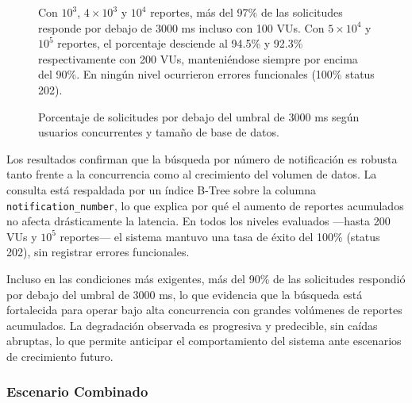 \begin{figure}[H]
\begin{minipage}{0.55\textwidth}
    \end{minipage}
    \hfill
    \begin{minipage}{0.40\textwidth}
        \small
        Con $10^3$, $4 \times 10^3$ y $10^4$ reportes, más del 97\% de las solicitudes responde por debajo de 3000 ms incluso con 100 VUs. Con $5 \times 10^4$ y $10^5$ reportes, el porcentaje desciende al 94.5\% y 92.3\% respectivamente con 200 VUs, manteniéndose siempre por encima del 90\%. 
        En ningún nivel ocurrieron errores funcionales (100\% status 202).
    \end{minipage}
    \caption{Porcentaje de solicitudes por debajo del umbral de 3000 ms según usuarios concurrentes y tamaño de base de datos.}
    \label{fig:busqueda-porcentaje}
\end{figure}


Los resultados confirman que la búsqueda por número de notificación es robusta tanto frente a la concurrencia como al crecimiento del volumen de datos. 
La consulta está respaldada por un índice B-Tree sobre la columna \texttt{notification\_number}, lo que explica por qué el aumento de reportes acumulados no afecta drásticamente la latencia.
En todos los niveles evaluados —hasta 200 VUs y $10^5$ reportes— el sistema mantuvo una tasa de éxito del 100\% (status 202), sin registrar errores funcionales.

Incluso en las condiciones más exigentes, más del 90\% de las solicitudes respondió por debajo del umbral de 3000 ms, lo que evidencia que la búsqueda está fortalecida para operar bajo alta concurrencia con grandes volúmenes de reportes acumulados. La degradación observada es progresiva y predecible, sin caídas abruptas, lo que permite anticipar el comportamiento del sistema ante escenarios de crecimiento futuro.

\subsubsection{Escenario Combinado}

